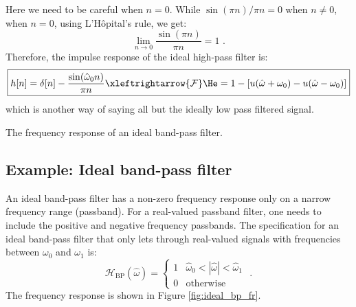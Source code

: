 Here we need to be careful when $n=0$. While $\sin(\pi n)/\pi n = 0$ when $n\ne 0$, when $n=0$, using L'H\^opital's rule, we get:
\begin{equation}
    \lim_{n\rightarrow 0} \frac{\sin(\pi n)}{\pi n} = 1\,\,.
\end{equation}
Therefore, the impulse response of the ideal high-pass filter is:
\begin{equation}
\boxed{
h[n]=\delta[n] - \frac{\sin(\hat{\omega}_0 n)}{\pi n} \xleftrightarrow{\mathcal{F}} \He = 1-[u(\hat{\omega}+\omega_0)-u(\hat{\omega}-\omega_0)]
}
\end{equation}
which is another way of saying all but the ideally low pass filtered
signal.

\begin{marginfigure}
\begin{center}
\end{center}
\caption{The frequency response of an ideal band-pass filter.}
\label{fig:ideal_bp_fr}
\end{marginfigure}

\subsection{Example: Ideal band-pass filter}
An ideal band-pass filter has a non-zero frequency response only on a
narrow frequency range (passband). For a real-valued passband
filter, one needs to include the positive and negative frequency passbands. The specification for an ideal band-pass filter that 
only lets through real-valued signals with frequencies between $\omega_0$ and
$\omega_1$ is:
\begin{equation}
\mathcal{H}_{\mathrm{BP}}(\hat{\omega}) = \left\{ \begin{array}{cc}
1 & \hat{\omega}_0 < |\hat{\omega}| < \hat{\omega}_1 \\
0 & \mathrm{otherwise}
\end{array}\right.\,\,.
\end{equation}
The frequency response is shown in Figure \ref{fig:ideal_bp_fr}.

